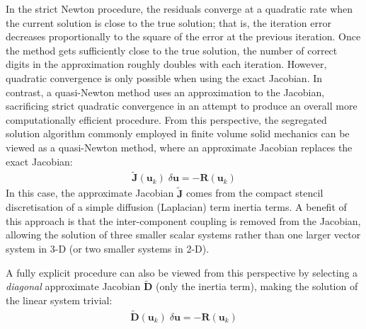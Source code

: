 \documentclass[sn-mathphys,Numbered]{sn-jnl}%
\newcommand{\bb}{\boldsymbol}
\begin{document}
In the strict Newton procedure, the residuals converge at a quadratic rate when the current solution is close to the true solution; that is, the iteration error decreases proportionally to the square of the error at the previous iteration.
Once the method gets sufficiently close to the true solution, the number of correct digits in the approximation roughly doubles with each iteration. 
However, quadratic convergence is only possible when using the exact Jacobian.
In contrast, a quasi-Newton method uses an approximation to the Jacobian, sacrificing strict quadratic convergence in an attempt to produce an overall more computationally efficient procedure.
From this perspective, the segregated solution algorithm commonly employed in finite volume solid mechanics can be viewed as a quasi-Newton method, where an approximate Jacobian replaces the exact Jacobian: 
\begin{eqnarray} \label{eq:Seg}
    \bb{\tilde{J}}(\bb{u}_k) \;\delta \bb{u} = -\bb{R}(\bb{u}_k)
\end{eqnarray}
In this case, the approximate Jacobian $\bb{\tilde{J}}$ comes from the compact stencil discretisation of a simple diffusion (Laplacian) term inertia terms.
A benefit of this approach is that the inter-component coupling is removed from the Jacobian, allowing the solution of three smaller scalar systems rather than one larger vector system in 3-D (or two smaller systems in 2-D).

A fully explicit procedure can also be viewed from this perspective by selecting a \emph{diagonal} approximate Jacobian $\bb{\tilde{D}}$ (only the inertia term), making the solution of the linear system trivial:
\begin{eqnarray} \label{eq:exp}
    \bb{\tilde{D}}(\bb{u}_k) \;\delta \bb{u} = -\bb{R}(\bb{u}_k)
\end{eqnarray}


\end{document}
